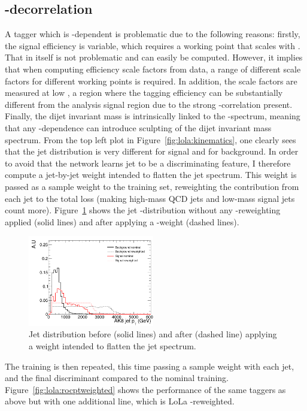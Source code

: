 \subsection{\PT-decorrelation}
A tagger which is \PT-dependent is problematic due to the following reasons: firstly, the signal efficiency is variable, which requires a working point that scales with \PT. That in itself is not problematic and can easily be computed. However, it implies that when computing efficiency scale factors from data, a range of different scale factors for different working points is required. In addition, the scale factors are measured at low \PT, a region where the tagging efficiency can be substantially different from the analysis signal region due to the strong \PT-correlation present. Finally, the dijet invariant mass is intrinsically linked to the \PT-spectrum, meaning that any \PT-dependence can introduce sculpting of the dijet invariant mass spectrum. From the top left plot in Figure~\ref{fig:lola:kinematics}, one clearly sees that the jet \PT distribution is very different for signal and for background. In order to avoid that the network learns jet \PT to be a discriminating feature, I therefore compute a jet-by-jet weight intended to flatten the jet \PT spectrum. This weight is passed as a sample weight to the training set, reweighting the contribution from each jet to the total loss (making high-mass QCD jets and low-mass signal jets count more). Figure~\ref{fig:lola:ptweight} shows the jet \PT-distribution without any \PT-reweighting applied (solid lines) and after applying a \PT-weight (dashed lines).
\begin{figure}[h!]
\centering
\includegraphics[width=0.49\textwidth]{figures/vtagging/AN-18-099/input/pt_reweighted/postWeight.png}
\caption{Jet \PT distribution before (solid lines) and after (dashed line) applying a weight intended to flatten the jet \PT spectrum.}
\label{fig:lola:ptweight}
\end{figure}
The training is then repeated, this time passing a sample weight with each jet, and the final discriminant compared to the nominal training. Figure~\ref{fig:lola:rocptweighted} shows the performance of the same taggers as above but with one additional line, which is LoLa \PT-reweighted.
